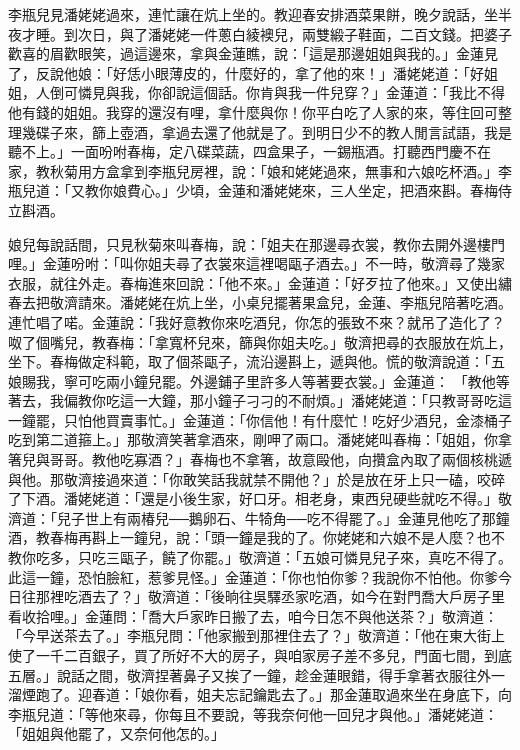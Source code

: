 李瓶兒見潘姥姥過來，連忙讓在炕上坐的。教迎春安排酒菜果餅，晚夕說話，坐半夜才睡。到次日，與了潘姥姥一件蔥白綾襖兒，兩雙緞子鞋面，二百文錢。把婆子歡喜的眉歡眼笑，過這邊來，拿與金蓮瞧，說：「這是那邊姐姐與我的。」金蓮見了，反說他娘：「好恁小眼薄皮的，什麼好的，拿了他的來！」潘姥姥道：「好姐姐，人倒可憐見與我，你卻說這個話。你肯與我一件兒穿？」金蓮道：「我比不得他有錢的姐姐。我穿的還沒有哩，拿什麼與你！你平白吃了人家的來，等住回可整理幾碟子來，篩上壺酒，拿過去還了他就是了。到明日少不的教人閒言試語，我是聽不上。」一面吩咐春梅，定八碟菜蔬，四盒果子，一錫瓶酒。打聽西門慶不在家，教秋菊用方盒拿到李瓶兒房裡，說：「娘和姥姥過來，無事和六娘吃杯酒。」李瓶兒道：「又教你娘費心。」少頃，金蓮和潘姥姥來，三人坐定，把酒來斟。春梅侍立斟酒。

娘兒每說話間，只見秋菊來叫春梅，說：「姐夫在那邊尋衣裳，教你去開外邊樓門哩。」金蓮吩咐：「叫你姐夫尋了衣裳來這裡喝甌子酒去。」不一時，敬濟尋了幾家衣服，就往外走。春梅進來回說：「他不來。」金蓮道：「好歹拉了他來。」又使出繡春去把敬濟請來。潘姥姥在炕上坐，小桌兒擺著果盒兒，金蓮、李瓶兒陪著吃酒。連忙唱了喏。金蓮說：「我好意教你來吃酒兒，你怎的張致不來？就吊了造化了？呶了個嘴兒，教春梅：「拿寬杯兒來，篩與你姐夫吃。」敬濟把尋的衣服放在炕上，坐下。春梅做定科範，取了個茶甌子，流沿邊斟上，遞與他。慌的敬濟說道：「五娘賜我，寧可吃兩小鐘兒罷。外邊鋪子里許多人等著要衣裳。」金蓮道： 「教他等著去，我偏教你吃這一大鐘，那小鐘子刁刁的不耐煩。」潘姥姥道：「只教哥哥吃這一鐘罷，只怕他買賣事忙。」金蓮道：「你信他！有什麼忙！吃好少酒兒，金漆桶子吃到第二道箍上。」那敬濟笑著拿酒來，剛呷了兩口。潘姥姥叫春梅：「姐姐，你拿箸兒與哥哥。教他吃寡酒？」春梅也不拿箸，故意毆他，向攢盒內取了兩個核桃遞與他。那敬濟接過來道：「你敢笑話我就禁不開他？」於是放在牙上只一磕，咬碎了下酒。潘姥姥道：「還是小後生家，好口牙。相老身，東西兒硬些就吃不得。」敬濟道：「兒子世上有兩椿兒──鵝卵石、牛犄角──吃不得罷了。」金蓮見他吃了那鐘酒，教春梅再斟上一鐘兒，說：「頭一鐘是我的了。你姥姥和六娘不是人麼？也不教你吃多，只吃三甌子，饒了你罷。」敬濟道：「五娘可憐見兒子來，真吃不得了。此這一鐘，恐怕臉紅，惹爹見怪。」金蓮道：「你也怕你爹？我說你不怕他。你爹今日往那裡吃酒去了？」敬濟道：「後晌往吳驛丞家吃酒，如今在對門喬大戶房子里看收拾哩。」金蓮問：「喬大戶家昨日搬了去，咱今日怎不與他送茶？」敬濟道：「今早送茶去了。」李瓶兒問：「他家搬到那裡住去了？」敬濟道：「他在東大街上使了一千二百銀子，買了所好不大的房子，與咱家房子差不多兒，門面七間，到底五層。」說話之間，敬濟捏著鼻子又挨了一鐘，趁金蓮眼錯，得手拿著衣服往外一溜煙跑了。迎春道：「娘你看，姐夫忘記鑰匙去了。」那金蓮取過來坐在身底下，向李瓶兒道：「等他來尋，你每且不要說，等我奈何他一回兒才與他。」潘姥姥道：「姐姐與他罷了，又奈何他怎的。」

